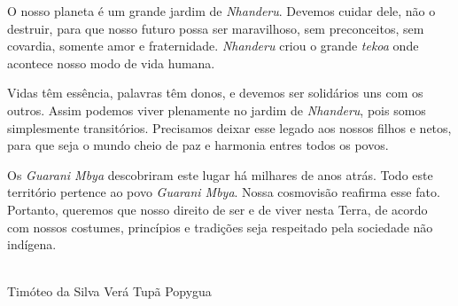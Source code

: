 
 


 

O nosso planeta é um grande jardim de \emph{Nhanderu}. Devemos cuidar
dele, não o destruir, para que nosso futuro possa ser maravilhoso, sem
preconceitos, sem covardia, somente amor e fraternidade. \emph{Nhanderu}
criou o grande \emph{tekoa} onde acontece nosso modo de vida humana.

Vidas têm essência, palavras têm donos, e devemos ser solidários uns com
os outros. Assim podemos viver plenamente no jardim de \emph{Nhanderu},
pois somos simplesmente transitórios. Precisamos deixar esse legado aos
nossos filhos e netos, para que seja o mundo cheio de paz e harmonia
entres todos os povos.

Os \emph{Guarani Mbya} descobriram este lugar há milhares de anos atrás.
Todo este território pertence ao povo \emph{Guarani Mbya}. Nossa
cosmovisão reafirma esse fato. Portanto, queremos que nosso direito de
ser e de viver nesta Terra, de acordo com nossos costumes, princípios e
tradições seja respeitado pela sociedade não indígena.

\medskip{} 

\hfill{}\\
\hfill Timóteo da Silva Verá Tupã Popygua
